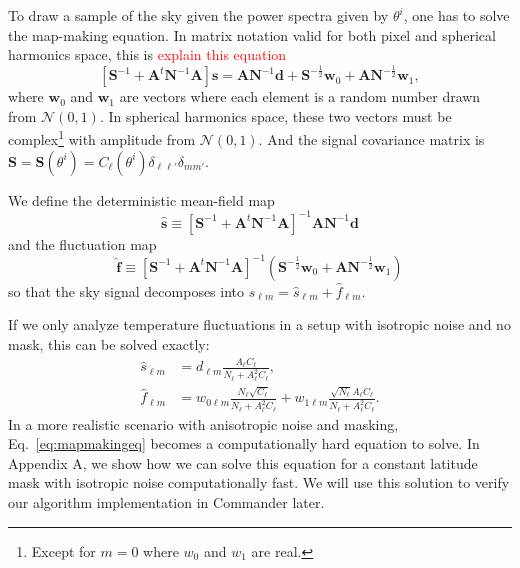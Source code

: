 \documentclass[twocolumn]{../common/aa}
\begin{document}
To draw a sample of the sky given the power spectra given by $\theta^i$, one has to solve the map-making equation. In matrix notation valid for both pixel and spherical harmonics space, this is \textcolor{red}{explain this equation}
\begin{equation}
    \label{eq:mapmakingeq}
    \left[\mathbf{S}^{-1} + \mathbf{A}^t \mathbf{N}^{-1}\mathbf{A} \right]\mathbf{s} = \mathbf{A} \mathbf{N}^{-1} \mathbf{d} + \mathbf{S}^{-\frac{1}{2}}\mathbf{w}_0 +\mathbf{A N}^{-\frac{1}{2}}\mathbf{w}_1,
\end{equation}
where $\mathbf{w}_0$ and $\mathbf{w}_1$ are vectors where each element is a random number drawn from $\mathcal{N}(0, 1)$. In spherical harmonics space, these two vectors must be complex\footnote{Except for $m=0$ where $w_0$ and $w_1$ are real.} with amplitude from $\mathcal{N}(0, 1)$. And the signal covariance matrix is $\mathbf{S} = \mathbf{S}(\theta^i) = C_{\ell}\left(\theta^i\right)\delta_{\ell \ell'}\delta_{mm'}$.

We define the deterministic mean-field map
\begin{equation}
\hat{\textbf{s}} \equiv \left[\mathbf{S}^{-1} + \mathbf{A}^t \mathbf{N}^{-1}\mathbf{A} \right]^{-1} \mathbf{A} \mathbf{N}^{-1} \mathbf{d}
\end{equation}
and the fluctuation map
\begin{equation}
\hat{\textbf{f}} \equiv \left[\mathbf{S}^{-1} + \mathbf{A}^t \mathbf{N}^{-1}\mathbf{A} \right]^{-1} \left(\mathbf{S}^{-\frac{1}{2}}\mathbf{w}_0 +\mathbf{A N}^{-\frac{1}{2}}\mathbf{w}_1 \right)
\end{equation}
so that the sky signal decomposes into $s_{\ell m} = \hat{s}_{\ell m} + \hat{f}_{\ell m}$.

If we only analyze temperature fluctuations in a setup with isotropic noise and no mask, this can be solved exactly:
\begin{align}
    \hat{s}_{\ell m} &= d_{\ell m}\frac{A_{\ell}C_{\ell}}{N_\ell + A_{\ell}^2C_{\ell}},\\
    \hat{f}_{\ell m} &= w_{0\ell m}\frac{N_{\ell}\sqrt{C_{\ell}}}{N_\ell + A_{\ell}^2C_{\ell}}+w_{1\ell m}\frac{\sqrt{N_{\ell}}A_{\ell}C_\ell}{N_\ell + A_{\ell}^2C_{\ell}}.
\end{align}
In a more realistic scenario with anisotropic noise and masking, Eq.~\eqref{eq:mapmakingeq} becomes a computationally hard equation to solve. In Appendix A, we show how we can solve this equation for a constant latitude mask with isotropic noise computationally fast. We will use this solution to verify our algorithm implementation in Commander later.
\end{document}
